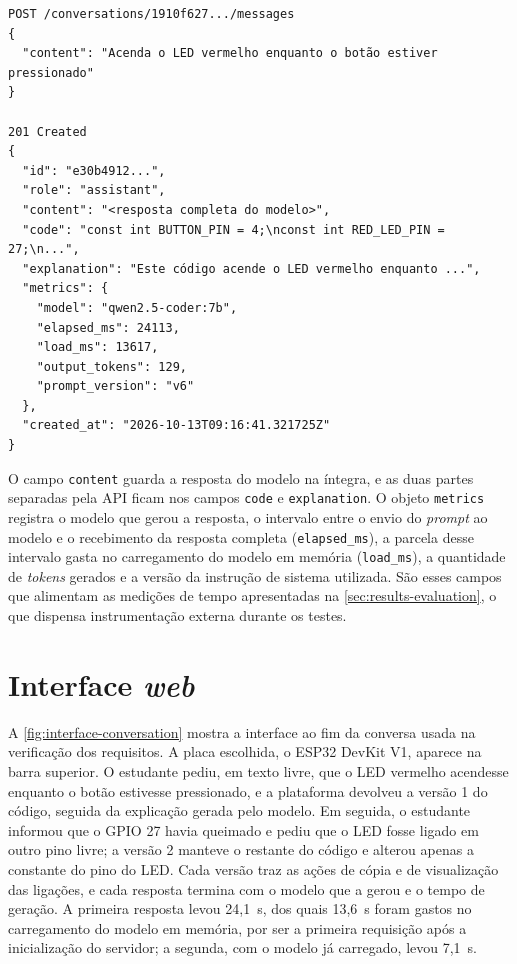 \begin{quadro}[!htb]
  \centering
  \caption{Exemplo de requisição e resposta da API}
  \label{qua:request-example}
  \begin{minipage}{\textwidth}
    \begin{lstlisting}
POST /conversations/1910f627.../messages
{
  "content": "Acenda o LED vermelho enquanto o botão estiver pressionado"
}

201 Created
{
  "id": "e30b4912...",
  "role": "assistant",
  "content": "<resposta completa do modelo>",
  "code": "const int BUTTON_PIN = 4;\nconst int RED_LED_PIN = 27;\n...",
  "explanation": "Este código acende o LED vermelho enquanto ...",
  "metrics": {
    "model": "qwen2.5-coder:7b",
    "elapsed_ms": 24113,
    "load_ms": 13617,
    "output_tokens": 129,
    "prompt_version": "v6"
  },
  "created_at": "2026-10-13T09:16:41.321725Z"
}
    \end{lstlisting}
  \end{minipage}
\end{quadro}

O campo \texttt{content} guarda a resposta do modelo na íntegra, e as duas partes separadas pela API ficam nos campos \texttt{code} e \texttt{explanation}. O objeto \texttt{metrics} registra o modelo que gerou a resposta, o intervalo entre o envio do \textit{prompt} ao modelo e o recebimento da resposta completa (\texttt{elapsed\_ms}), a parcela desse intervalo gasta no carregamento do modelo em memória (\texttt{load\_ms}), a quantidade de \textit{tokens} gerados e a versão da instrução de sistema utilizada. São esses campos que alimentam as medições de tempo apresentadas na \autoref{sec:results-evaluation}, o que dispensa instrumentação externa durante os testes.

\section{Interface \textit{web}}
\label{sec:results-web}

A \autoref{fig:interface-conversation} mostra a interface ao fim da conversa usada na verificação dos requisitos. A placa escolhida, o ESP32 DevKit V1, aparece na barra superior. O estudante pediu, em texto livre, que o LED vermelho acendesse enquanto o botão estivesse pressionado, e a plataforma devolveu a versão 1 do código, seguida da explicação gerada pelo modelo. Em seguida, o estudante informou que o GPIO 27 havia queimado e pediu que o LED fosse ligado em outro pino livre; a versão 2 manteve o restante do código e alterou apenas a constante do pino do LED. Cada versão traz as ações de cópia e de visualização das ligações, e cada resposta termina com o modelo que a gerou e o tempo de geração. A primeira resposta levou 24,1~s, dos quais 13,6~s foram gastos no carregamento do modelo em memória, por ser a primeira requisição após a inicialização do servidor; a segunda, com o modelo já carregado, levou 7,1~s.

